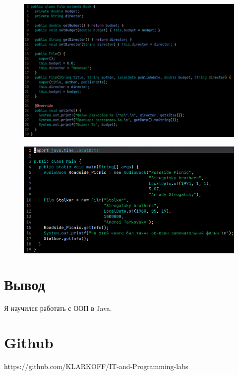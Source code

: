 \documentclass[a4paper, 17pt]{extarticle}
\begin{document}
\pagebreak

\begin{figure}[h]
  \includegraphics[width=\textwidth]{film.png}
  \caption{}
\end{figure}
\begin{figure}[h]
\includegraphics[width=\textwidth]{main.png}
\caption{}
\end{figure}

\pagebreak

\section{Вывод}
Я научился работать с ООП в Java.

\section{Github}
https://github.com/KLARKOFF/IT-and-Programming-labs
\end{document}
